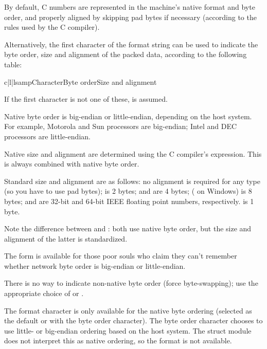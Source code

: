 By default, C numbers are represented in the machine's native format
and byte order, and properly aligned by skipping pad bytes if
necessary (according to the rules used by the C compiler).

Alternatively, the first character of the format string can be used to
indicate the byte order, size and alignment of the packed data,
according to the following table:

\begin{tableiii}{c|l|l}{samp}{Character}{Byte order}{Size and alignment}
\end{tableiii}

If the first character is not one of these,  is assumed.

Native byte order is big-endian or little-endian, depending on the
host system.  For example, Motorola and Sun processors are big-endian;
Intel and DEC processors are little-endian.

Native size and alignment are determined using the C compiler's
 expression.  This is always combined with native byte
order.

Standard size and alignment are as follows: no alignment is required
for any type (so you have to use pad bytes);
 is 2 bytes;
 and  are 4 bytes;
 ( on Windows) is 8 bytes;
 and  are 32-bit and 64-bit
IEEE floating point numbers, respectively.
 is 1 byte.

Note the difference between  and \character{=}: both use
native byte order, but the size and alignment of the latter is
standardized.

The form \character{!} is available for those poor souls who claim they
can't remember whether network byte order is big-endian or
little-endian.

There is no way to indicate non-native byte order (force
byte-swapping); use the appropriate choice of \character{<} or
\character{>}.

The  format character is only available for the native
byte ordering (selected as the default or with the  byte
order character). The byte order character \character{=} chooses to
use little- or big-endian ordering based on the host system. The
struct module does not interpret this as native ordering, so the
 format is not available.

